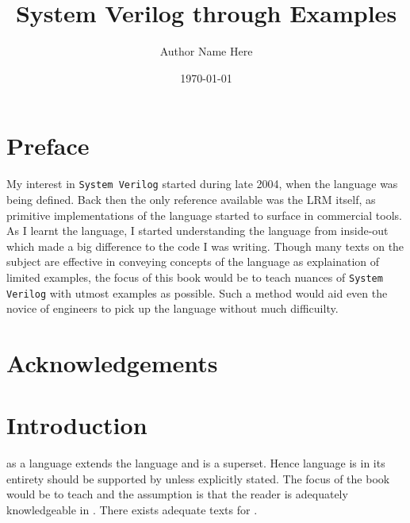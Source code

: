 \documentclass[11pt]{book}              %
\title{\bf System Verilog through Examples}    %
\author{Author Name Here}              %
\date{\today}                           %
\begin{document}



\frontmatter                            %
\maketitle                              %
\tableofcontents                        %

\chapter{Preface}
My interest in \texttt{System Verilog} started during late 2004, when
the language was being defined. Back then the only reference available
was the LRM itself, as primitive implementations of the language
started to surface in commercial tools. As I learnt the language, I
started understanding the language from inside-out which made a big
difference to the code I was writing. Though many texts on the subject
are effective in conveying concepts of the language as explaination of
limited examples, the focus of this book would be to teach nuances of
\texttt{System Verilog} with utmost examples as possible. Such a
method would aid even the novice of engineers to pick up the language
without much difficuilty.

\chapter{Acknowledgements}

\chapter{Introduction}                %
\lsvlog as a language extends the \lvlog language and is a
superset. Hence \lvlog language is in its entirety should be supported
by \lsvlog unless explicitly stated. The focus of the book would be to
teach \lsvlog and the assumption is that the reader is adequately
knowledgeable in \lvlog. There exists adequate texts for \lvlog.

\mainmatter                             %



\end{document}
